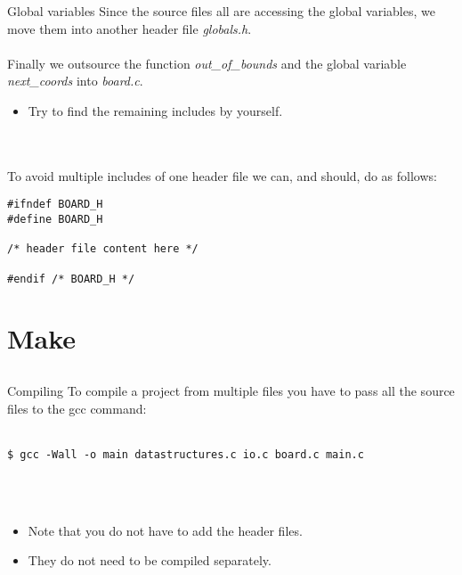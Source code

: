 \begin{frame}[fragile]{Global variables}
	Since the source files all are accessing the global variables, we move them into another header file \textit{globals.h}.\\\ \\
	Finally we outsource the function \textit{out\_of\_bounds} and the global variable \textit{next\_coords} into \textit{board.c}.\\
	\begin{itemize}
		\item Try to find the remaining includes by yourself.
	\end{itemize}\ \\\ \\
	To avoid multiple includes of one header file we can, and should, do as follows:
	\begin{lstlisting}
#ifndef BOARD_H
#define BOARD_H

/* header file content here */

#endif /* BOARD_H */
\end{lstlisting}
\end{frame}

\section{Make}
\subsection{}
\begin{frame}[fragile]{Compiling}
	To compile a project from multiple files you have to pass all the source files to the gcc command:\\\ \\
	\begin{lstlisting}[numbers=none]
$ gcc -Wall -o main datastructures.c io.c board.c main.c
\end{lstlisting}\ \\\ \\
	\begin{itemize}
		\item Note that you do not have to add the header files.
		\item They do not need to be compiled separately.
	\end{itemize}
\end{frame}

